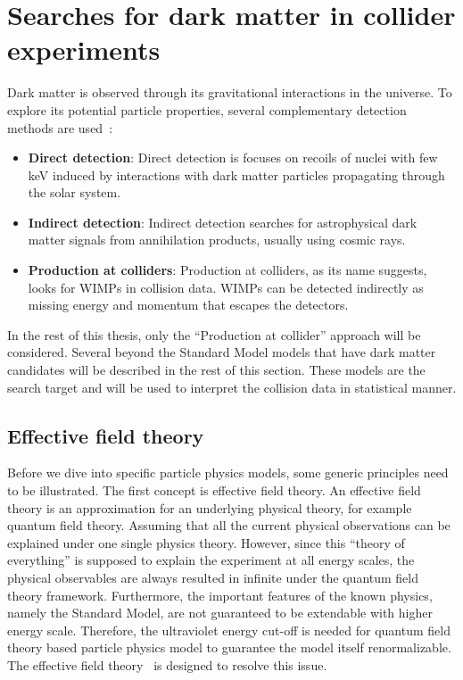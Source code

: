 \section{Searches for dark matter in collider experiments}
\label{sec:dms3}
\par Dark matter is observed through its gravitational interactions in the universe. To explore its potential particle properties, several complementary detection methods are used~\cite{Undagoitia:2015gya}: 
\begin{itemize}
  \item \textbf{Direct detection}: Direct detection is focuses on recoils of nuclei with few keV induced by interactions with dark matter particles propagating through the solar system.
  \item \textbf{Indirect detection}: Indirect detection searches for astrophysical dark matter signals from annihilation products, usually using cosmic rays.
  \item \textbf{Production at colliders}: Production at colliders, as its name suggests, looks for WIMPs in collision data. WIMPs can be detected indirectly as missing energy and momentum that escapes the detectors.
\end{itemize}

\par In the rest of this thesis, only the ``Production at collider'' approach will be considered. Several beyond the Standard Model models that have dark matter candidates will be described in the rest of this section. These models are the search target and will be used to interpret the collision data in statistical manner.

\subsection{Effective field theory}
Before we dive into specific particle physics models, some generic principles need to be illustrated. The first concept is effective field theory. An effective field theory is an approximation for an underlying physical theory, for example quantum field theory. Assuming that all the current physical observations can be explained under one single physics theory. However, since this “theory of everything” is supposed to explain the experiment at all energy scales, the physical observables are always resulted in infinite under the quantum field theory framework. Furthermore, the important features of the known physics, namely the Standard Model, are not guaranteed to be extendable with higher energy scale. Therefore, the ultraviolet energy cut-off is needed for quantum field theory based particle physics model to guarantee the model itself renormalizable. The effective field theory~\cite{Pich:1998xt} is designed to resolve this issue.


